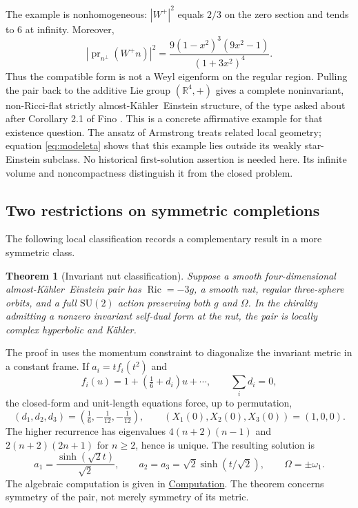 \documentclass[11pt,a4paper]{article}
\newtheorem{inputtheorem}[theorem]{Theorem}
\theoremstyle{definition}
\theoremstyle{remark}
\newcommand{\Ric}{\operatorname{Ric}}
\newcommand{\R}{\mathbb R}
\newcommand{\AK}{almost-K\"ahler}
\begin{document}
The example is nonhomogeneous: $|W^+|^2$ equals $2/3$ on the zero section and tends to $6$ at infinity. Moreover,
\begin{equation}\label{eq:modeleta}
 |\operatorname{pr}_{n^\perp}(W^+n)|^2
 =\frac{9(1-x^2)^3(9x^2-1)}{(1+3x^2)^4}.
\end{equation}
Thus the compatible form is not a Weyl eigenform on the regular region. Pulling the pair back to the additive Lie group $(\R^4,+)$ gives a complete noninvariant, non-Ricci-flat strictly \AK\ Einstein structure, of the type asked about after Corollary 2.1 of Fino \cite{Fino}. This is a concrete affirmative example for that existence question. The ansatz of Armstrong \cite{ArmstrongAnsatz} treats related local geometry; equation \eqref{eq:modeleta} shows that this example lies outside its weakly star-Einstein subclass. No historical first-solution assertion is needed here. Its infinite volume and noncompactness distinguish it from the closed problem.

\subsection{Two restrictions on symmetric completions}
The following local classification records a complementary result in a more symmetric class.
\begin{inputtheorem}[Invariant nut classification]\label{input:nut}
Suppose a smooth four-dimensional \AK\ Einstein pair has $\Ric=-3g$, a smooth nut, regular three-sphere orbits, and a full $\mathrm{SU}(2)$ action preserving both $g$ and $\Omega$. In the chirality admitting a nonzero invariant self-dual form at the nut, the pair is locally complex hyperbolic and K\"ahler.
\end{inputtheorem}
The proof in \cite{Repository} uses the momentum constraint to diagonalize the invariant metric in a constant frame. If $a_i=t f_i(t^2)$ and
\[
 f_i(u)=1+(\tfrac16+d_i)u+\cdots,\qquad \sum_i d_i=0,
\]
the closed-form and unit-length equations force, up to permutation,
\[
 (d_1,d_2,d_3)=(\tfrac16,-\tfrac1{12},-\tfrac1{12}),\qquad
 (X_1(0),X_2(0),X_3(0))=(1,0,0).
\]
The higher recurrence has eigenvalues $4(n+2)(n-1)$ and $2(n+2)(2n+1)$ for $n\ge2$, hence is unique. The resulting solution is
\[
 a_1=\frac{\sinh(\sqrt2t)}{\sqrt2},\qquad
 a_2=a_3=\sqrt2\sinh(t/\sqrt2),\qquad \Omega=\pm\omega_1.
\]
The algebraic computation is given in \href{https://github.com/Cherish0925/Geometric-Analysis/blob/main/research/computations/bianchi_ix_nut.py}{Computation}. The theorem concerns symmetry of the pair, not merely symmetry of its metric.
\end{document}
